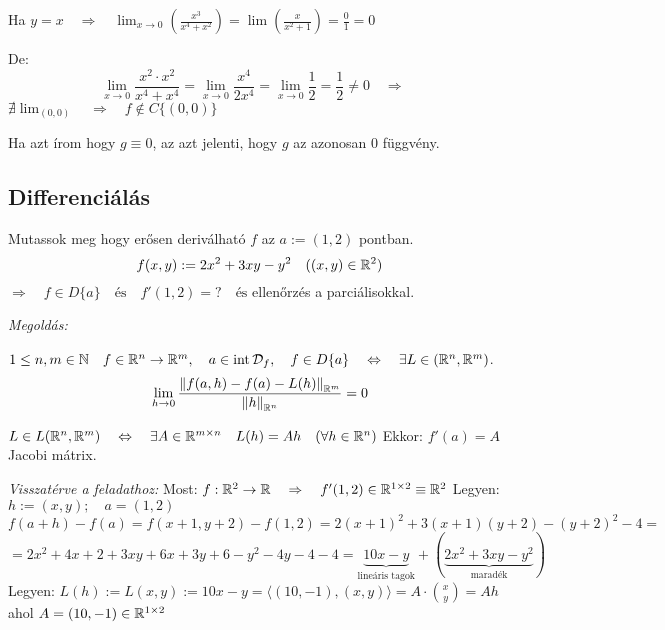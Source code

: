 \documentclass[a4paper,11.5pt]{article}
\DeclareMathOperator{\Int}{int}
\newcommand{\norm}[1]{\left\lVert#1\right\rVert}
\begin{document}
\begin{task}
\begin{enumerate}
			Ha $y=x\quad \Rightarrow\quad \lim_{x\to0}\left(\frac{x^3}{x^4+x^2}\right)=\lim\left(\frac{x}{x^2+1}\right)=\frac{0}{1}=0$
			
			De: %
			\[ \lim_{x\to0}\frac{x^2\cdot x^2}{x^4+x^4}=\lim_{x\to0}\frac{x^4}{2x^4}=\lim_{x\to0}\frac{1}{2}=\frac{1}{2}\not=0\quad \Rightarrow\quad  \]
			$\nexists\lim_{(0,0)}\quad \Rightarrow \quad f\notin C\{(0,0)\}$
		\end{enumerate}
		\begin{note}
			Ha azt írom hogy $g\equiv0$, az azt jelenti, hogy $g$ az azonosan 0 függvény.
		\end{note}
		\subsection{Differenciálás}
		\begin{task} Mutassok meg hogy erősen deriválható $f$ az $a:=(1,2)$ pontban.
			\[ f(x,y):=2x^2+3xy-y^2 \quad ((x,y)\in\mathbb{R}^2) \]
			$\Rightarrow\quad f\in D\{a\}\quad \text{és}\quad f'(1,2)=?\quad \text{és}$ ellenőrzés a parciálisokkal.
			
			\textit{Megoldás:}
			\begin{revision}
				$1\leq n,m\in\N\quad f\in\R^n\to\R^m,\quad a\in \Int \mathcal{D}_f,\quad f\in D\{ a \}\quad \Leftrightarrow \quad \exists L\in\LARGE(\R^n,\R^m)$.
				\[ \lim_{h\to0} \frac{\norm{f(a,h)-f(a)-L(h)}_{\R^m}}{\norm{h}_{\R^n}}=0 \]
			\end{revision}
			\begin{revision}
				$L\in L(\mathbb{R}^n,\mathbb{R}^m)\quad \Leftrightarrow\quad \exists A\in\mathbb{R}^{m\times n}\quad L(h)=Ah\quad (\forall h\in\mathbb{R}^n)$
				 Ekkor: $f'(a)=A$ Jacobi mátrix.
			\end{revision}
			\textit{Visszatérve a feladathoz:}
			Most: $f:\mathbb{R}^2\to\mathbb{R}\quad \Rightarrow\quad f'(1,2)\in\mathbb{R}^{1\times 2}\equiv \mathbb{R}{^2}$
			Legyen: $h:=(x,y);\quad a=(1,2)$
			\[ f(a+h)-f(a)=f(x+1,y+2)-f(1,2)=2(x+1)^2+3(x+1)(y+2)-(y+2)^2-4=\]\[=2x^2+4x+2+3xy+6x+3y+6-y^2-4y-4-4=\underbrace{10x-y}_{\text{lineáris tagok}}+(\underbrace{2x^2+3xy-y^2}_{\text{maradék}}) \]
			Legyen: $L(h):=L(x,y):=10x-y=\langle(10,-1),(x,y)\rangle=A\cdot\binom{x}{y}=Ah$ ahol $A=(10,-1)\in\mathbb{R}^{1\times2}$
			

\end{task}
\end{task}
\end{document}
